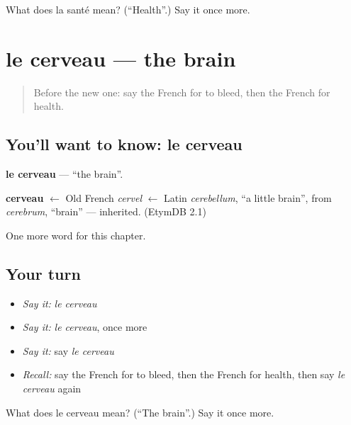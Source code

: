 \begin{tcolorbox}[breakable,colback=teal!4,colframe=teal!35!black,title={Before you move on}]
What does la santé mean? (\textquotedblleft{}Health\textquotedblright{}.) Say it once more.
\end{tcolorbox}
\section[le cerveau]{le cerveau — the brain}

\label{lesson:FR-C154-cerveau}



\begin{quote}
Before the new one: say the French for to bleed, then the French for health.
\end{quote}

\subsection*{You'll want to know: le cerveau}
\textbf{le cerveau} — \textquotedblleft{}the brain\textquotedblright{}.

\begin{cousinweb}
\textbf{cerveau} $\leftarrow$ Old French \emph{cervel} $\leftarrow$ Latin \emph{cerebellum}, \textquotedblleft{}a little brain\textquotedblright{}, from \emph{cerebrum}, \textquotedblleft{}brain\textquotedblright{} — inherited. (EtymDB 2.1)
\end{cousinweb}

\begin{grammarlens}[title={What you've built}]
One more word for this chapter.
\end{grammarlens}

\subsection*{Your turn}
\begin{itemize}
\raggedright
  \item \emph{Say it:} \emph{le cerveau}
  \item \emph{Say it:} \emph{le cerveau}, once more
  \item \emph{Say it:} say \emph{le cerveau}
  \item \emph{Recall:} say the French for to bleed, then the French for health, then say \emph{le cerveau} again
\end{itemize}

\begin{tcolorbox}[breakable,colback=teal!4,colframe=teal!35!black,title={Before you move on}]
What does le cerveau mean? (\textquotedblleft{}The brain\textquotedblright{}.) Say it once more.
\end{tcolorbox}
